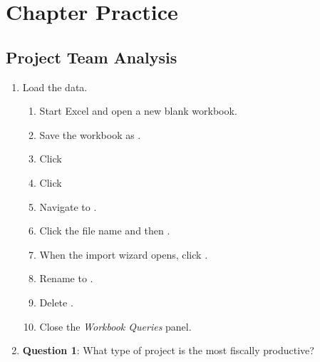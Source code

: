 \section{Chapter Practice}

\subsection{Project Team Analysis}

\begin{enumerate}
	\item Load the data.

	\begin{enumerate}
		\item Start Excel and open a new blank workbook.
		\item Save the workbook as .
		\item {} Click 
		\item {} Click 
		\item Navigate to .
		\item Click the file name and then .
		\item When the import wizard opens, click .
		\item Rename  to .
		\item Delete .
		\item Close the \textit{Workbook Queries} panel.
	\end{enumerate}

	\item{\textbf{Question 1}: What type of project is the most fiscally productive?}


\end{enumerate}
